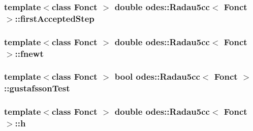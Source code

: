 \subsubsection[{first\+Accepted\+Step}]{\setlength{\rightskip}{0pt plus 5cm}template$<$class Fonct $>$ double {\bf odes\+::\+Radau5cc}$<$ Fonct $>$\+::first\+Accepted\+Step\hspace{0.3cm}{\ttfamily [private]}}\label{classodes_1_1Radau5cc_a1a7b580bbae9fcd5c49fa116e877ac5c}
\hypertarget{classodes_1_1Radau5cc_af6debb655768cb0a251e2886544d87cb}{}
\subsubsection[{fnewt}]{\setlength{\rightskip}{0pt plus 5cm}template$<$class Fonct $>$ double {\bf odes\+::\+Radau5cc}$<$ Fonct $>$\+::fnewt\hspace{0.3cm}{\ttfamily [private]}}\label{classodes_1_1Radau5cc_af6debb655768cb0a251e2886544d87cb}
\hypertarget{classodes_1_1Radau5cc_ad867e67510b9f73391d1778c96bb8e06}{}
\subsubsection[{gustafsson\+Test}]{\setlength{\rightskip}{0pt plus 5cm}template$<$class Fonct $>$ bool {\bf odes\+::\+Radau5cc}$<$ Fonct $>$\+::gustafsson\+Test\hspace{0.3cm}{\ttfamily [private]}}\label{classodes_1_1Radau5cc_ad867e67510b9f73391d1778c96bb8e06}
\hypertarget{classodes_1_1Radau5cc_afa3dc089844e77046c958a4ff2dcab1a}{}
\subsubsection[{h}]{\setlength{\rightskip}{0pt plus 5cm}template$<$class Fonct $>$ double {\bf odes\+::\+Radau5cc}$<$ Fonct $>$\+::h\hspace{0.3cm}{\ttfamily [private]}}\label{classodes_1_1Radau5cc_afa3dc089844e77046c958a4ff2dcab1a}
\hypertarget{classodes_1_1Radau5cc_a868b61b5db9d458fd554f004ca366a52}{}
